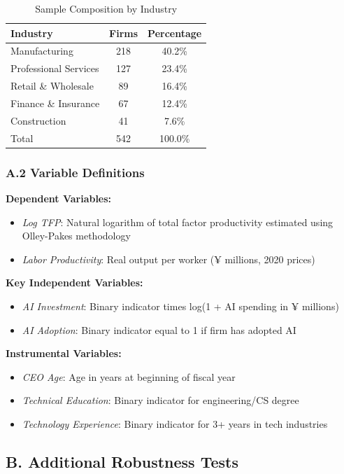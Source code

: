 \documentclass[12pt]{article}
\begin{document}
\begin{table}[H]
\centering
\caption{Sample Composition by Industry}
\label{tab:sample_composition}
\begin{tabular}{lcc}
\toprule
Industry & Firms & Percentage \\
\midrule
Manufacturing & 218 & 40.2\% \\
Professional Services & 127 & 23.4\% \\
Retail \& Wholesale & 89 & 16.4\% \\
Finance \& Insurance & 67 & 12.4\% \\
Construction & 41 & 7.6\% \\
\midrule
Total & 542 & 100.0\% \\
\bottomrule
\end{tabular}
\end{table}

\subsubsection*{A.2 Variable Definitions}

\textbf{Dependent Variables:}
\begin{itemize}
\item \textit{Log TFP}: Natural logarithm of total factor productivity estimated using Olley-Pakes methodology
\item \textit{Labor Productivity}: Real output per worker (¥ millions, 2020 prices)
\end{itemize}

\textbf{Key Independent Variables:}
\begin{itemize}
\item \textit{AI Investment}: Binary indicator times log(1 + AI spending in ¥ millions)
\item \textit{AI Adoption}: Binary indicator equal to 1 if firm has adopted AI
\end{itemize}

\textbf{Instrumental Variables:}
\begin{itemize}
\item \textit{CEO Age}: Age in years at beginning of fiscal year
\item \textit{Technical Education}: Binary indicator for engineering/CS degree
\item \textit{Technology Experience}: Binary indicator for 3+ years in tech industries
\end{itemize}

\subsection*{B. Additional Robustness Tests}
\end{document}
